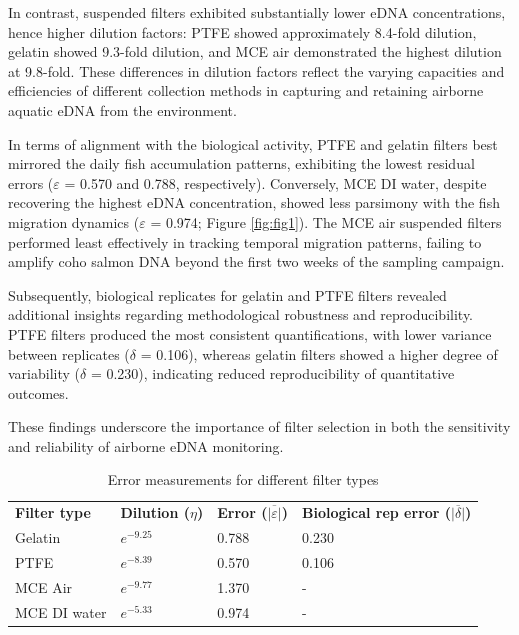 \documentclass{article}
\begin{document}
In contrast, suspended filters exhibited substantially lower eDNA concentrations, hence higher dilution factors: PTFE showed approximately 8.4-fold dilution, gelatin showed 9.3-fold dilution, and MCE air demonstrated the highest dilution at 9.8-fold. These differences in dilution factors reflect the varying capacities and efficiencies of different collection methods in capturing and retaining airborne aquatic eDNA from the environment.

In terms of alignment with the biological activity, PTFE and gelatin filters best mirrored the daily fish accumulation patterns, exhibiting the lowest residual errors ($\varepsilon$ = 0.570 and 0.788, respectively).  Conversely, MCE DI water, despite recovering the highest eDNA concentration, showed less parsimony with the fish migration dynamics ($\varepsilon$ = 0.974; Figure \ref{fig:fig1}). The MCE air suspended filters performed least effectively in tracking temporal migration patterns, failing to amplify coho salmon DNA beyond the first two weeks of the sampling campaign.

Subsequently, biological replicates for gelatin and PTFE filters revealed additional insights regarding methodological robustness and reproducibility. PTFE filters produced the most consistent quantifications, with lower variance between replicates ($\delta$ = 0.106), whereas gelatin filters showed a higher degree of variability ($\delta$ = 0.230), indicating reduced reproducibility of quantitative outcomes. 

These findings underscore the importance of filter selection in both the sensitivity and reliability of airborne eDNA monitoring.

\begin{table}[h!]
\centering
\caption{Error measurements for different filter types}
\label{tab:filter_error}

\begin{tabular}{llll}
\textbf{Filter type} & \textbf{Dilution ($\eta$)} & \textbf{Error ($\overline{|\varepsilon|}$)} & \textbf{Biological rep error ($\overline{|\delta|}$)} \\
Gelatin & $e^{-9.25}$ & 0.788 & 0.230 \\
PTFE & $e^{-8.39}$ & 0.570 & 0.106 \\
MCE Air & $e^{-9.77}$ & 1.370 & - \\
MCE DI water & $e^{-5.33}$ & 0.974 & - \\
\end{tabular}
\end{table}
\end{document}
